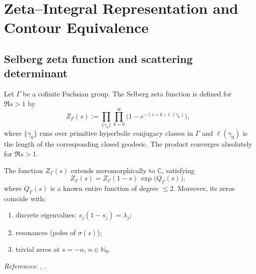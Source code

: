 
\section{Zeta–Integral Representation and Contour Equivalence}
\label{sec:ch4-part4-zeta-integral} \relax \hspace{0pt}

\subsection{Selberg zeta function and scattering determinant}
\label{subsec:ch4-part4-zeta-def} \relax

\begin{definition}
\label{def:selberg-zeta}
Let $\Gamma$ be a cofinite Fuchsian group. The Selberg zeta function is defined for $\Re s>1$ by
\[
Z_\Gamma(s) := \prod_{\{\gamma_0\}}\prod_{k=0}^{\infty}
\Big(1 - e^{-(s+k)\ell(\gamma_0)}\Big),
\]
where $\{\gamma_0\}$ runs over primitive hyperbolic conjugacy classes in $\Gamma$ and $\ell(\gamma_0)$ is the length of the corresponding closed geodesic. The product converges absolutely for $\Re s>1$. \relax
\end{definition}

\begin{theorem}
\label{thm:selberg-zeta-FE}
The function $Z_\Gamma(s)$ extends meromorphically to $\mathbb{C}$, satisfying
\[
Z_\Gamma(s) = Z_\Gamma(1-s)\,\exp\!\Big(Q_\Gamma(s)\Big),
\]
where $Q_\Gamma(s)$ is a known entire function of degree $\le 2$. Moreover, its zeros coincide with:
\begin{enumerate}[label=(\alph*)]
  \item discrete eigenvalues: $s_j(1-s_j)=\lambda_j$;
  \item resonances (poles of $\sigma(s)$);
  \item trivial zeros at $s=-n$, $n\in\mathbb{N}_0$.
\end{enumerate}
\emph{References:} \cite[Ch.~10]{Hejhal1983vol2}, \cite{Selberg1956}. \relax
\end{theorem}

